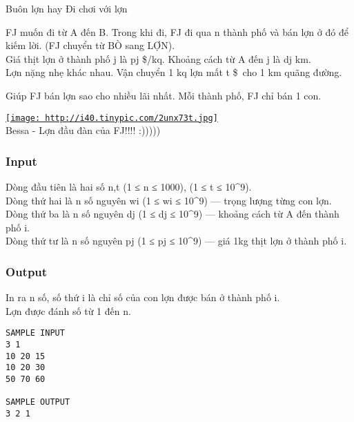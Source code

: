 

Buôn lợn hay Đi chơi với lợn

FJ muốn đi từ A đến B. Trong khi đi, FJ đi qua n thành phố và bán lợn ở đó để kiếm lời. (FJ chuyển từ BÒ sang LỢN).
\\Giá thịt lợn ở thành phố j là pj \$/kq. Khoảng cách từ A đến j là dj km.
\\Lợn nặng nhẹ khác nhau. Vận chuyển 1 kq lợn mất t \$ cho 1 km quãng đường. 

Giúp FJ bán lợn sao cho nhiều lãi nhất. Mỗi thành phố, FJ chỉ bán 1 con.

\href{http://tinypic.com}{
\texttt{[image: http://i40.tinypic.com/2unx73t.jpg]}}
\\Bessa - Lợn đầu đàn của FJ!!!! :)))))

\subsubsection{Input}

Dòng đầu tiên là hai số n,t (1 ≤ n ≤ 1000), (1 ≤ t ≤ 10^9).
\\Dòng thứ hai là n số nguyên wi (1 ≤ wi ≤ 10^9) — trọng lượng từng con lợn.
\\Dòng thứ ba là n số nguyên dj (1 ≤ dj ≤ 10^9) — khoảng cách từ A đến thành phố i.
\\Dòng thứ tư là n số nguyên pj (1 ≤ pj ≤ 10^9) — giá 1kg thịt lợn ở thành phố i.

\subsubsection{Output}

In ra n số, số thứ i là chỉ số của con lợn được bán ở thành phố i.
\\Lợn được đánh số từ 1 đến n.
\begin{verbatim}
SAMPLE INPUT
3 1
10 20 15
10 20 30
50 70 60

SAMPLE OUTPUT
3 2 1\end{verbatim}
